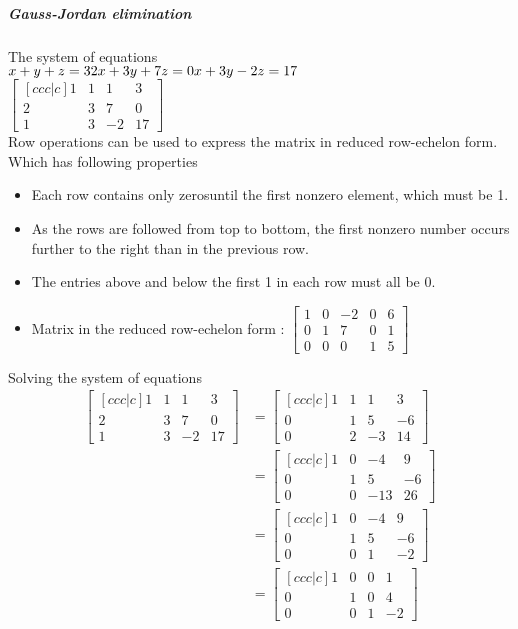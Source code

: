 \documentclass[12pt, right open]{memoir}
\begin{document}
\subparagraph{Gauss-Jordan elimination}
The system of equations \\
$
 x +  y +  z = 3 \\
2x + 3y + 7z = 0 \\
 x + 3y - 2z = 17
 $ \\
$
\begin{bmatrix} [ccc|c]
1 & 1 & 1 & 3 \\
2 & 3 & 7 & 0 \\
1 & 3 & -2 & 17
\end{bmatrix}
$ \\
Row operations can be used to express the matrix in reduced row-echelon form. \\
Which has following properties
\begin{itemize}
\item Each row contains only zerosuntil the first nonzero element, which must be 1.
\item As the rows are followed from top to bottom, the first nonzero number occurs further to the right than in the previous row.
\item The entries above and below the first 1 in each row must all be 0.
\item Matrix in the reduced row-echelon form :
$
\begin{bmatrix} 
1 & 0 & -2 & 0 & 6\\
0 & 1 & 7 & 0 & 1\\
0 & 0 & 0 & 1 & 5
\end{bmatrix}
$ \\
\end{itemize}

Solving the system of equations \\
\begin{align*}   
\begin{bmatrix} [ccc|c]
1 & 1 & 1 & 3 \\
2 & 3 & 7 & 0 \\
1 & 3 & -2 & 17
\end{bmatrix} 
&=
\begin{bmatrix} [ccc|c]
1 & 1 & 1 & 3 \\
0 & 1 & 5 & -6 \\
0 & 2 & -3 & 14
\end{bmatrix} \\
&=
\begin{bmatrix} [ccc|c]
1 & 0 & -4 & 9 \\
0 & 1 & 5 & -6 \\
0 & 0 & -13 & 26
\end{bmatrix} \\
&=
\begin{bmatrix} [ccc|c]
1 & 0 & -4 & 9 \\
0 & 1 & 5 & -6 \\
0 & 0 & 1 & -2
\end{bmatrix} \\
&=
\begin{bmatrix} [ccc|c]
1 & 0 & 0 & 1 \\
0 & 1 & 0 & 4 \\
0 & 0 & 1 & -2
\end{bmatrix}
\end{align*}   
\end{document}
